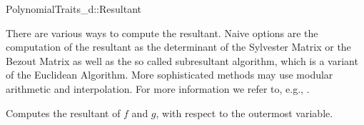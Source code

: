 \begin{ccRefConcept}{PolynomialTraits_d::Resultant}
\begin{ccAdvanced}
\end{ccAdvanced}


There are various ways to compute the resultant. 
Naive options are the computation of the resultant as the determinant of 
the Sylvester Matrix or the Bezout 
Matrix as well as the so called subresultant algorithm, 
which is a variant of the Euclidean Algorithm. 
More sophisticated methods may use modular arithmetic and interpolation. 
For more information we refer to, e.g., \cite{gg-mca-99}. 

\ccRefines 
{}

\ccTypes
{}
\ccGlue
{}
\ccGlue
{}

\ccOperations
{}
         { Computes the resultant of $f$ and $g$, 
           with respect to the outermost variable.}



\ccSeeAlso

\\
\\
\\
\\
\\

\end{ccRefConcept}
